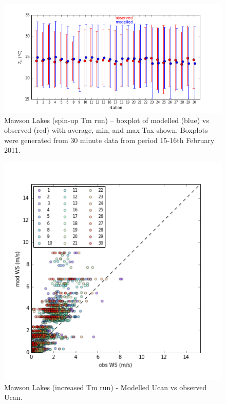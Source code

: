 \documentclass[final,3p,times,authoryear]{elsarticle}
\begin{document}
\begin{figure}[!htbp]
\includegraphics[trim=0mm 0mm 0mm 0mm, clip,scale=0.5]{images/MawsonBox.png}
 \caption{Mawson Lakes (spin-up Tm run) – boxplot of modelled  (blue) vs observed  (red) with average, min, and max Tax shown. Boxplots were generated from 30 minute data from period 15-16th February 2011.} \label{fig:MawsonBox}
\end{figure}





\begin{figure}[!htbp]
\includegraphics[trim=0mm 0mm 0mm 0mm, clip,scale=0.5]{images/MawsonUcan.png}
 \caption{Mawson Lakes (increased Tm run) - Modelled Ucan vs observed Ucan.} \label{fig:MawsonUcan}
\end{figure}
\end{document}
